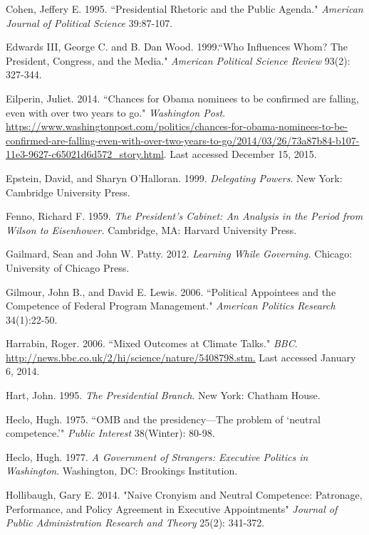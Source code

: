 \documentclass[12pt]{article}
\begin{document}
\noindent \hangindent=0.7cm Cohen, Jeffery E. 1995. ``Presidential Rhetoric and the Public Agenda." \textit{American Journal of Political Science} 39:87-107. 

\noindent \hangindent=0.7cm Edwards III, George C. and B. Dan Wood. 1999.``Who Influences Whom? The President, Congress, and the Media." \textit{American Political Science Review} 93(2): 327-344.

\noindent \hangindent=0.7cm Eilperin, Juliet. 2014. ``Chances for Obama nominees to be confirmed are falling, even with over two years to go." \textit{Washington Post}. \url{https://www.washingtonpost.com/politics/chances-for-obama-nominees-to-be-confirmed-are-falling-even-with-over-two-years-to-go/2014/03/26/73a87b84-b107-11e3-9627-c65021d6d572_story.html}. Last accessed December 15, 2015. 

\noindent \hangindent=0.7cm Epstein, David, and Sharyn O'Halloran. 1999. \textit{Delegating Powers}. New York: Cambridge University Press. 

\noindent \hangindent=0.7cm Fenno, Richard F. 1959. \textit{The President's Cabinet: An Analysis in the Period from Wilson to Eisenhower.} Cambridge, MA: Harvard University Press.

\noindent \hangindent=0.7cm Gailmard, Sean and John W. Patty. 2012. \textit{Learning While Governing.} Chicago: University of Chicago Press. 

\noindent \hangindent=0.7cm Gilmour, John B., and David E. Lewis. 2006. ``Political Appointees and the Competence of Federal Program Management." \textit{American Politics Research} 34(1):22-50. 

\noindent \hangindent=0.7cm Harrabin, Roger. 2006.  ``Mixed Outcomes at Climate Talks." \textit{BBC}. \url{http://news.bbc.co.uk/2/hi/science/nature/5408798.stm.} Last accessed January 6, 2014.

\noindent \hangindent=0.7cm Hart, John. 1995. \textit{The Presidential Branch}.  New York: Chatham House.

\noindent \hangindent=0.7cm Heclo, Hugh. 1975. ``OMB and the presidency---The problem of `neutral competence.'" \textit{Public Interest} 38(Winter): 80-98.

\noindent \hangindent=0.7cm Heclo, Hugh. 1977. \textit{A Government of Strangers: Executive Politics in Washington}. Washington, DC: Brookings Institution.

\noindent \hangindent=0.7cm Hollibaugh, Gary E. 2014. "Naive Cronyism and Neutral Competence: Patronage, Performance, and Policy Agreement in Executive Appointments" \textit{Journal of Public Administration Research and Theory} 25(2): 341-372. 
\end{document}
